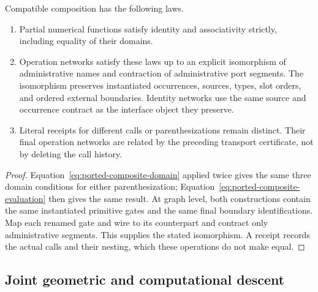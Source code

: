 \begin{corollary}
\label{cor:ported-composition-equalities}
Compatible composition has the following laws.
\begin{enumerate}
  \item Partial numerical functions satisfy identity and associativity
  strictly, including equality of their domains.
  \item Operation networks satisfy these laws up to an explicit isomorphism
  of administrative names and contraction of administrative port segments.
  The isomorphism preserves instantiated occurrences, sources, types, slot
  orders, and ordered external boundaries.  Identity networks use the same
  source and occurrence contract as the interface object they preserve.
  \item Literal receipts for different calls or parenthesizations remain
  distinct.  Their final operation networks are related by the preceding
  transport certificate, not by deleting the call history.
\end{enumerate}
\end{corollary}
\begin{proof}
Equation~\eqref{eq:ported-composite-domain} applied twice gives the same three
domain conditions for either parenthesization;
Equation~\eqref{eq:ported-composite-evaluation} then gives the same result.
At graph level, both constructions contain the same instantiated primitive
gates and the same final boundary identifications.  Map each renamed gate and
wire to its counterpart and contract only administrative segments.  This
supplies the stated isomorphism.  A receipt records the actual calls and their
nesting, which these operations do not make equal.
\end{proof}

\subsection{Joint geometric and computational descent}

